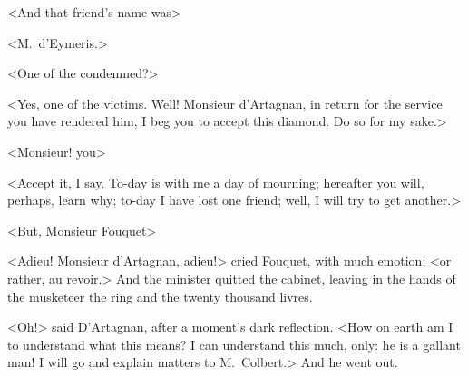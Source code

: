 <And that friend's name was\longdash>

<M.~d'Eymeris.>

<One of the condemned?>

<Yes, one of the victims. Well! Monsieur d'Artagnan, in return for the service you have rendered him, I beg you to accept this diamond. Do so for my sake.>

<Monsieur! you\longdash>

<Accept it, I say. To-day is with me a day of mourning; hereafter you will, perhaps, learn why; to-day I have lost one friend; well, I will try to get another.>

<But, Monsieur Fouquet\longdash>

<Adieu! Monsieur d'Artagnan, adieu!> cried Fouquet, with much emotion; <or rather, au revoir.> And the minister quitted the cabinet, leaving in the hands of the musketeer the ring and the twenty thousand livres.

<Oh!> said D'Artagnan, after a moment's dark reflection. <How on earth am I to understand what this means?  I can understand this much, only: he is a gallant man! I will go and explain matters to M.~Colbert.> And he went out. 